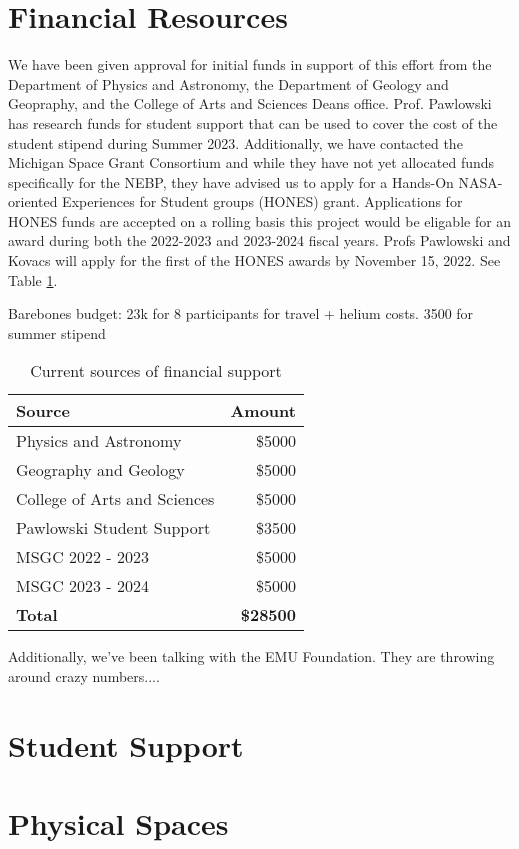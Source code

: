 \documentclass[12pt]{article}
\begin{document}
\section{Financial Resources}
We have been given approval for initial funds in support of this effort
from the Department of Physics and Astronomy, the Department of
Geology and Geopraphy, and the College of Arts and Sciences Deans office.
Prof. Pawlowski has research funds for student support that can be used to cover
the cost of the student stipend during Summer 2023.
Additionally, we have contacted the Michigan Space Grant Consortium
and while they have not yet allocated funds specifically for the NEBP, they
have advised us to apply for a Hands-On NASA-oriented Experiences for Student groups
(HONES) grant. Applications for HONES funds are accepted on a rolling basis
this project would be eligable for an award during both the 2022-2023 and
2023-2024 fiscal years. Profs Pawlowski and Kovacs will apply for
the first of the HONES awards by November 15, 2022. See Table \ref{money}.

Barebones budget: 23k for 8 participants for travel + helium costs. 3500 for summer
stipend

\begin{table}[h]
\centering
\begin{tabular}{|l|r|}
\hline
Source&Amount\\
\hline
Physics and Astronomy&\$5000\\
Geography and Geology&\$5000\\
College of Arts and Sciences&\$5000\\
Pawlowski Student Support&\$3500\\
MSGC 2022 - 2023&\$5000\\
MSGC 2023 - 2024&\$5000\\
{\bf Total}&{\bf \$28500}\\
\hline
\end{tabular}
\caption{Current sources of financial support}
\label{money}
\end{table}

Additionally, we've been talking with the EMU Foundation. They are throwing around
crazy numbers....

\newpage
\section{Student Support}



\section{Physical Spaces}
\end{document}
